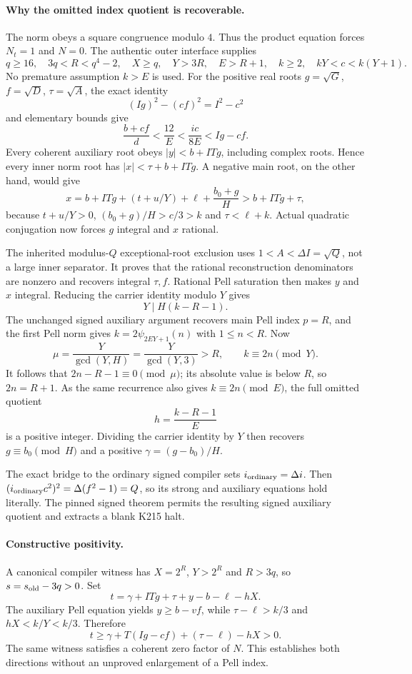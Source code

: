 \paragraph{Why the omitted index quotient is recoverable.}
The norm obeys a square congruence modulo $4$. Thus the product equation
forces $N_t=1$ and $N=0$. The authentic outer interface supplies
\[
q\ge16,\quad 3q<R<q^4-2,\quad X\ge q,\quad
Y>3R,\quad E>R+1,\quad k\ge2,\quad kY<c<k(Y+1).
\]
No premature assumption $k>E$ is used. For the positive real roots
$g=\sqrt G$, $f=\sqrt D$, $\tau=\sqrt A$, the exact identity
\[
 (Ig)^2-(cf)^2=I^2-c^2
\]
and elementary bounds give
\[
 \frac{b+cf}{d}<\frac{12}{E}
 <\frac{ic}{8E}<Ig-cf.
\]
Every coherent auxiliary root obeys $|y|<b+ITg$, including complex roots.
Hence every inner norm root has $|x|<\tau+b+ITg$. A negative main root,
on the other hand, would give
\[
 x=b+ITg+(t+u/Y)+\ell+\frac{b_0+g}{H}
   >b+ITg+\tau,
\]
because $t+u/Y>0$, $(b_0+g)/H>c/3>k$ and $\tau<\ell+k$.
Actual quadratic conjugation now forces $g$ integral and $x$ rational.

The inherited modulus-$Q$ exceptional-root exclusion uses
$1<A<\Delta I=\sqrt Q$, not a large inner separator. It proves that the
rational reconstruction denominators are nonzero and recovers integral
$\tau,f$. Rational Pell saturation then makes $y$ and $x$ integral.
Reducing the carrier identity modulo $Y$ gives
\[
 Y\mid H(k-R-1).
\]
The unchanged signed auxiliary argument recovers main Pell index $p=R$,
and the first Pell norm gives $k=2\psi_{2EY+1}(n)$ with $1\le n<R$.
Now
\[
 \mu=\frac{Y}{\gcd(Y,H)}=\frac{Y}{\gcd(Y,3)}>R,
 \qquad k\equiv2n\pmod Y.
\]
It follows that $2n-R-1\equiv0\pmod\mu$; its absolute value is below $R$,
so $2n=R+1$. As the same recurrence also gives $k\equiv2n\pmod E$, the
full omitted quotient
\[
 h=\frac{k-R-1}{E}
\]
is a positive integer. Dividing the carrier identity by $Y$ then recovers
$g\equiv b_0\pmod H$ and a positive $\gamma=(g-b_0)/H$.

The exact bridge to the ordinary signed compiler sets
$i_{\rm ordinary}=\Delta i$. Then
$(i_{\rm ordinary}c^2)^2=\Delta(f^2-1)=Q$, so its strong and auxiliary
equations hold literally. The pinned signed theorem permits the resulting
signed auxiliary quotient and extracts a blank K215 halt.

\paragraph{Constructive positivity.}
A canonical compiler witness has $X=2^R$, $Y>2^R$ and $R>3q$, so
$s=s_{\rm old}-3q>0$. Set
\[
 t=\gamma+ITg+\tau+y-b-\ell-hX.
\]
The auxiliary Pell equation yields $y\ge b-vf$, while
$\tau-\ell>k/3$ and $hX<k/Y<k/3$. Therefore
\[
 t\ge\gamma+T(Ig-cf)+(\tau-\ell)-hX>0.
\]
The same witness satisfies a coherent zero factor of $N$. This establishes
both directions without an unproved enlargement of a Pell index.

